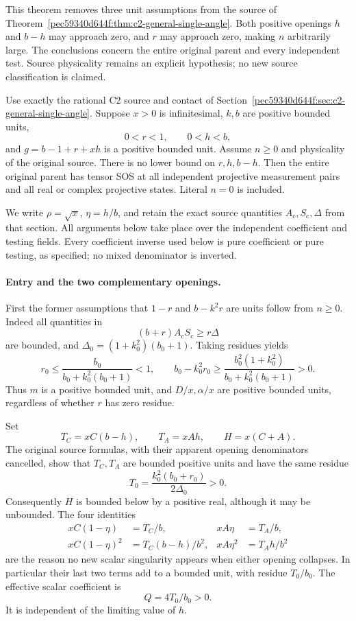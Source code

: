 This theorem removes three unit assumptions from the source of
Theorem~\ref{pec59340d644f:thm:c2-general-single-angle}.  Both positive openings $h$
and $b-h$ may approach zero, and $r$ may approach zero, making $n$
arbitrarily large.  The conclusions concern the entire original parent
and every independent test.  Source physicality remains an explicit
hypothesis; no new source classification is claimed.

\begin{theorem}
\label{p81893ad08bed:thm:c2-three-openings}
Use exactly the rational C2 source and contact of
Section~\ref{pec59340d644f:sec:c2-general-single-angle}.  Suppose $x>0$ is
infinitesimal, $k,b$ are positive bounded units,
\[
             0<r<1,\qquad 0<h<b,
\]
and $g=b-1+r+xh$ is a positive bounded unit.  Assume $n\geq0$
and physicality of the original source.  There is no lower bound on
$r,h,b-h$.  Then the entire original parent has tensor SOS at all
independent projective measurement pairs and all real or complex
projective states.  Literal $n=0$ is included.
\end{theorem}

We write $\rho=\sqrt x$, $\eta=h/b$, and retain the exact source
quantities $A_c,S_c,\Delta$ from that section.  All arguments below
take place over the independent coefficient and testing fields.
Every coefficient inverse used below is pure coefficient or pure
testing, as specified; no mixed denominator is inverted.

\paragraph{Entry and the two complementary openings.}
First the former assumptions that $1-r$ and $b-k^2r$ are units follow
from $n\geq0$.  Indeed all quantities in
\[
                 (b+r)A_cS_c\geq r\Delta
\]
are bounded, and $\Delta_0=(1+k_0^2)(b_0+1)$.  Taking residues yields
\[
 r_0\leq\frac{b_0}{b_0+k_0^2(b_0+1)}<1,
 \qquad
 b_0-k_0^2r_0\geq
 \frac{b_0^2(1+k_0^2)}{b_0+k_0^2(b_0+1)}>0.
\]
Thus $m$ is a positive bounded unit, and $D/x,\alpha/x$ are positive
bounded units, regardless of whether $r$ has zero residue.

Set
\[
 T_C=xC(b-h),\qquad T_A=xAh,\qquad H=x(C+A).
\]
The original source formulas, with their apparent opening denominators
cancelled, show that $T_C,T_A$ are bounded positive units and have the
same residue
\[
 T_0=\frac{k_0^2(b_0+r_0)}{2\Delta_0}>0.
\]
Consequently $H$ is bounded below by a positive real, although it may
be unbounded.  The four identities
\begin{align*}
 xC(1-\eta)&=T_C/b,&xA\eta&=T_A/b,\\
 xC(1-\eta)^2&=T_C(b-h)/b^2,&
 xA\eta^2&=T_Ah/b^2                                      \tag{CO1}
\end{align*}
are the reason no new scalar singularity appears when either opening
collapses.  In particular their last two terms add to a bounded unit,
with residue $T_0/b_0$.  The effective scalar coefficient is
\[
                         Q=4T_0/b_0>0.                  \tag{CO2}
\]
It is independent of the limiting value of $h$.

